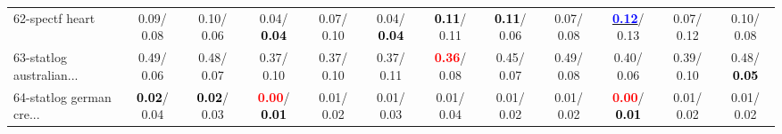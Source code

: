 \begin{table}[h]
\begin{center}
{\begin{tabular}{lc|c|c|c|c|c|c|c|c|c|c}
62-spectf heart &   0.09/  0.08 &   0.10/  0.06 &   0.04/\textcolor{black}{\textbf{  0.04}} &   0.07/  0.10 &   0.04/\textcolor{black}{\textbf{  0.04}} & \textcolor{black}{\textbf{  0.11}}/  0.11 & \textcolor{black}{\textbf{  0.11}}/  0.06 &   0.07/  0.08 & \underline{\textcolor{blue}{\textbf{  0.12}}}/  0.13 &   0.07/  0.12 &   0.10/  0.08 \\
63-statlog australian... &   0.49/  0.06 &   0.48/  0.07 &   0.37/  0.10 &   0.37/  0.10 &   0.37/  0.11 & \textcolor{red}{\textbf{  0.36}}/  0.08 &   0.45/  0.07 &   0.49/  0.08 &   0.40/  0.06 &   0.39/  0.10 &   0.48/\textcolor{black}{\textbf{  0.05}} \\
64-statlog german cre... & \textcolor{black}{\textbf{  0.02}}/  0.04 & \textcolor{black}{\textbf{  0.02}}/  0.03 & \textcolor{red}{\textbf{  0.00}}/\textcolor{black}{\textbf{  0.01}} &   0.01/  0.02 &   0.01/  0.03 &   0.01/  0.04 &   0.01/  0.02 &   0.01/  0.02 & \textcolor{red}{\textbf{  0.00}}/\textcolor{black}{\textbf{  0.01}} &   0.01/  0.02 &   0.01/  0.02 \\\end{tabular}}\label{stratsALCKappa1aVFDT}
\end{center}
\end{table}
